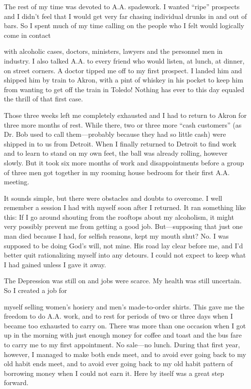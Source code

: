 \begin{biblechapter}
The rest of my time was devoted to A.A. spadework. I wanted “ripe” prospects and I didn’t feel that I would get very far chasing individual drunks in and out of bars. So I spent much of my time calling on the people who I felt would logically come in contact

with alcoholic cases, doctors, ministers, lawyers and the personnel men in industry. I also talked A.A. to every friend who would listen, at lunch, at dinner, on street corners. A doctor tipped me off to my first prospect. I landed him and shipped him by train to Akron, with a pint of whiskey in his pocket to keep him from wanting to get off the train in Toledo! Nothing has ever to this day equaled the thrill of that first case.

Those three weeks left me completely exhausted and I had to return to Akron for three more months of rest. While there, two or three more “cash customers” (as Dr. Bob used to call them—probably because they had so little cash) were shipped in to us from Detroit. When I finally returned to Detroit to find work and to learn to stand on my own feet, the ball was already rolling, however slowly. But it took six more months of work and disappointments before a group of three men got together in my rooming house bedroom for their first A.A. meeting.

It sounds simple, but there were obstacles and doubts to overcome. I well remember a session I had with myself soon after I returned. It ran something like this: If I go around shouting from the rooftops about my alcoholism, it might very possibly prevent me from getting a good job. But—supposing that just one man died because I had, for selfish reasons, kept my mouth shut? No. I was supposed to be doing God’s will, not mine. His road lay clear before me, and I’d better quit rationalizing myself into any detours. I could not expect to keep what I had gained unless I gave it away.

The Depression was still on and jobs were scarce. My health was still uncertain. So I created a job for

myself selling women’s hosiery and men’s made-to-order shirts. This gave me the freedom to do A.A. work, and to rest for periods of two or three days when I became too exhausted to carry on. There was more than one occasion when I got up in the morning with just enough money for coffee and toast and the bus fare to carry me to my first appointment. No sale—no lunch. During that first year, however, I managed to make both ends meet, and to avoid ever going back to my old habit ends meet, and to avoid ever going back to my old habit pattern of borrowing money when I could not earn it. Here by itself was a great step forward.


\end{biblechapter}
